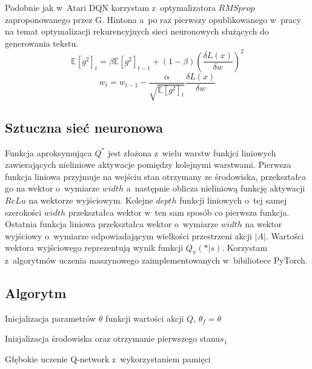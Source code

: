 \documentclass[12pt, oneside]{article}
\begin{document}
Podobnie jak w~Atari DQN\cite{mnih2013playing} korzystam z~optymalizatora $RMSprop$ zaproponowanego przez G. Hintona\cite{rmssource} a~po raz pierwszy opublikowanego w~pracy na temat optymalizacji rekurencyjnych sieci neuronowych służących do generowania tekstu\cite{rms}. 
\begin{equation}
\mathbb{E}[g^2]_t=\beta \mathbb{E}[g^2]_{t-1}+(1-\beta)(\frac{\delta L(x) }{ \delta w})^2
\end{equation}
\begin{equation}
w_t = w_{t-1}-\frac{\alpha}{\sqrt{\mathbb{E}[g^2]_t}} \frac{\delta L(x) }{ \delta w}
\end{equation}

\subsection{Sztuczna sieć neuronowa}
Funkcja aproksymująca $Q^*$  jest złożona z~wielu warstw funkjci liniowych zawierających nieliniowe aktywacje pomiędzy kolejnymi warstwami. Pierwsza funkcja liniowa przyjmuje na wejściu stan otrzymany ze środowiska, przekształca go na wektor o~wymiarze $width$ a~następnie oblicza nieliniową funkcję aktywacji $ReLu$\cite{relu} na wektorze wyjściowym. Kolejne $depth$ funkcji liniowych o~tej samej szerokości $width$ przekształca wektor w~ten sam sposób co pierwsza funkcja. Ostatnia funkcja liniowa przekształca wektor o~wymiarze $width$ na wektor wyjściowy  o~wymiarze odpowiadającym wielkości przestrzeni akcji $|A|$. Wartości wektora wyjściowego reprezentują wynik funkcji $Q_\pi(*|s)$. Korzystam z~algorytmów uczenia maszynowego zaimplementowanych w~bibiliotece PyTorch\cite{torch}.
\newpage
\subsection{Algorytm}
\begin{algorithm} 

 Inicjalizacja parametrów $\theta$ funkcji wartości akcji $Q$, $\theta_f = \theta$

 Inizjalizacja środowiska oraz otrzymanie pierwszego stanu$s_1$
 
 
 \caption{Głębokie uczenie Q-network z~wykorzystaniem pamięci}
\end{algorithm}
\end{document}

